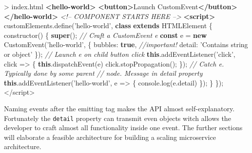 \documentclass[]{assets/latex/ieee}
\newenvironment{Shaded}{}{}
\newcommand{\KeywordTok}[1]{\textcolor[rgb]{0.00,0.44,0.13}{\textbf{{#1}}}}
\newcommand{\DataTypeTok}[1]{\textcolor[rgb]{0.56,0.13,0.00}{{#1}}}
\newcommand{\StringTok}[1]{\textcolor[rgb]{0.25,0.44,0.63}{{#1}}}
\newcommand{\SpecialStringTok}[1]{\textcolor[rgb]{0.73,0.40,0.53}{{#1}}}
\newcommand{\CommentTok}[1]{\textcolor[rgb]{0.38,0.63,0.69}{\textit{{#1}}}}
\newcommand{\VariableTok}[1]{\textcolor[rgb]{0.10,0.09,0.49}{{#1}}}
\newcommand{\OperatorTok}[1]{\textcolor[rgb]{0.40,0.40,0.40}{{#1}}}
\newcommand{\AttributeTok}[1]{\textcolor[rgb]{0.49,0.56,0.16}{{#1}}}
\newcommand{\NormalTok}[1]{{#1}}
\begin{document}
\begin{Shaded}
\begin{Highlighting}[]
\NormalTok{> index.html}
\KeywordTok{<hello-world>}
  \KeywordTok{<button>}\NormalTok{Launch CustomEvent}\KeywordTok{</button>}
\KeywordTok{</hello-world>}
\CommentTok{<!-- COMPONENT STARTS HERE -->}
\KeywordTok{<script>}
  \VariableTok{customElements}\NormalTok{.}\AttributeTok{define}\NormalTok{(}\StringTok{'hello-world'}\OperatorTok{,} 
  \KeywordTok{class} \KeywordTok{extends} \NormalTok{HTMLElement }\OperatorTok{\{}
    \AttributeTok{constructor}\NormalTok{() }\OperatorTok{\{}
      \KeywordTok{super}\NormalTok{()}\OperatorTok{;}
      \CommentTok{// Craft a CustomEvent e}
      \KeywordTok{const} \NormalTok{e }\OperatorTok{=} \KeywordTok{new} \AttributeTok{CustomEvent}\NormalTok{(}\StringTok{'hello-world'}\OperatorTok{,} \OperatorTok{\{}
        \DataTypeTok{bubbles}\OperatorTok{:} \KeywordTok{true}\OperatorTok{,} \CommentTok{//important!}
        \DataTypeTok{detail}\OperatorTok{:} \StringTok{'Contains string or object'}
      \OperatorTok{\}}\NormalTok{)}\OperatorTok{;}
      \CommentTok{// Launch e on child button click}
      \KeywordTok{this}\NormalTok{.}\AttributeTok{addEventListener}\NormalTok{(}\StringTok{'click'}\OperatorTok{,} \NormalTok{click }\OperatorTok{=>} \OperatorTok{\{}
        \KeywordTok{this}\NormalTok{.}\AttributeTok{dispatchEvent}\NormalTok{(e)}
        \VariableTok{click}\NormalTok{.}\AttributeTok{stopPropagation}\NormalTok{()}\OperatorTok{;}
      \OperatorTok{\}}\NormalTok{)}\OperatorTok{;}
      \CommentTok{// Catch e. Typically done by some parent}
      \CommentTok{// node. Message in detail property}
      \KeywordTok{this}\NormalTok{.}\AttributeTok{addEventListener}\NormalTok{(}\StringTok{'hello-world'}\OperatorTok{,} \NormalTok{e }\OperatorTok{=>} \OperatorTok{\{}
        \VariableTok{console}\NormalTok{.}\AttributeTok{log}\NormalTok{(}\VariableTok{e}\NormalTok{.}\AttributeTok{detail}\NormalTok{)}
      \OperatorTok{\}}\NormalTok{)}\OperatorTok{;}
    \OperatorTok{\}}
  \OperatorTok{\}}\NormalTok{)}\OperatorTok{;}
\OperatorTok{<}\SpecialStringTok{/script>}
\end{Highlighting}
\end{Shaded}

Naming events after the emitting tag makes the API almost
self-explanatory. Fortunately the \texttt{detail} property can transmit
even objects witch allows the developer to craft almost all
functionality inside one event. The further sections will elaborate a
feasible architecture for building a scaling microservice architecture.
\end{document}
